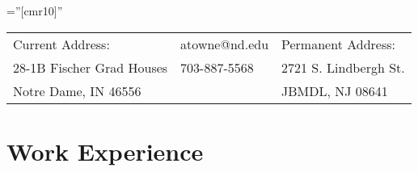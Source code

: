 \documentclass[a4paper,10pt]{article} %
\begin{document}
\pagestyle{empty} %

\font\fb=''[cmr10]'' %


\par{\par} %

\begin{tabularx}{\textwidth}{XZY}
    \hline
    Current Address: & atowne@nd.edu & Permanent Address:\\
    28-1B Fischer Grad Houses & 703-887-5568 & 2721 S. Lindbergh St.\\
    Notre Dame, IN 46556 & & JBMDL, NJ 08641\\
    \hline
\end{tabularx}


\section{Work Experience}
\end{document}
